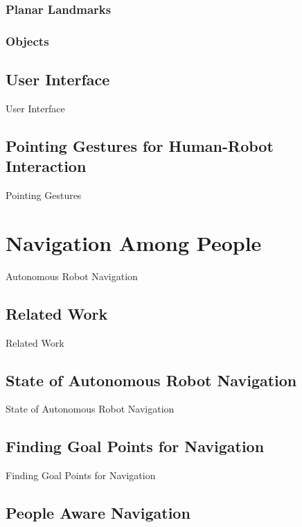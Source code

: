 \documentclass[12pt]{gatech-thesis}
\begin{document}
\subsection{Planar Landmarks}

\subsection{Objects}


\section{User Interface}

User Interface


\section{Pointing Gestures for Human-Robot Interaction}

Pointing Gestures


\chapter{Navigation Among People}

Autonomous Robot Navigation

\section{Related Work}

Related Work

\section{State of Autonomous Robot Navigation}

State of Autonomous Robot Navigation

\section{Finding Goal Points for Navigation}

Finding Goal Points for Navigation

\section{People Aware Navigation}
\end{document}
